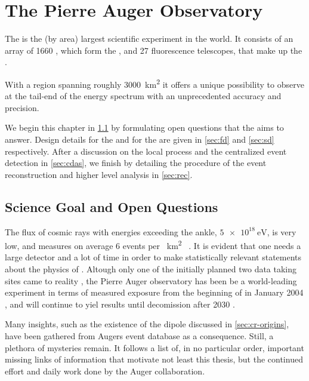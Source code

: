 
\chapter{The Pierre Auger Observatory}
\label{chap:pierre-auger-observatory}

The \PAO is the (by area) largest scientific experiment in the world. It 
consists of an array of 1660 \WCDs, which form the \SD, and 27 fluorescence 
telescopes, that make up the \FD.

With a region spanning roughly \SI{3000}{\kilo\meter\squared} it offers a unique
possibility to observe \UHECRs at the tail-end of the \CR energy spectrum with
an unprecedented accuracy and precision.

We begin this chapter in \cref{sec:science-case} by formulating open questions 
that the \PAO aims to answer. Design details for the \FD and for the \SD are 
given in \cref{sec:fd} and \cref{sec:sd} respectively. After a discussion on the
local \DAQ process and the centralized event detection in \cref{sec:cdas}, we 
finish by detailing the procedure of the event reconstruction and higher level 
analysis in \cref{sec:rec}.

\section{Science Goal and Open Questions}
\label{sec:science-case}

The flux of cosmic rays with energies exceeding the ankle, $\SI{5e18}{\eV}$, is 
very low, and measures on average 6 events per \SI{}{\km\squared\year}
\cite{Fenu2023}. It is evident that one needs a large detector and a lot of time
in order to make statistically relevant statements about the physics of \UHECRs.
Altough only one of the initially planned two data taking sites came to reality 
\cite[for white paper see][]{Zavrtanik2000}, the Pierre Auger observatory has 
been be a world-leading experiment in terms of measured exposure from the 
beginning of \DAQ in January 2004 \cite{Abraham2004}, and will continue to yiel
results until decomission after 2030 \cite{Castellina2023}.

Many insights, such as the existence of the \CR dipole discussed in
\cref{sec:cr-origins}, have been gathered from Augers event database as a 
consequence. Still, a plethora of mysteries remain. It follows a list of, in no 
particular order, important missing links of information that motivate not least
this thesis, but the continued effort and daily work done by the Auger 
collaboration.

